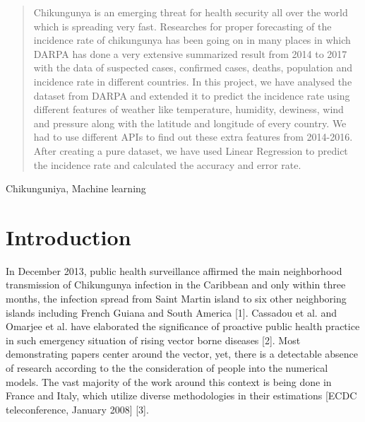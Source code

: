 \documentclass[conference]{IEEEtran}
\begin{document}




\maketitle

\thispagestyle{fancy}

\begin{abstract}
Chikungunya   is an emerging threat for health security all over the world  which is spreading very fast. Researches for proper forecasting of the incidence rate of chikungunya has been going on in many places in which DARPA has done a very extensive summarized result from 2014 to 2017 with the data of suspected cases, confirmed cases, deaths, population and incidence rate in different countries. In this project, we have analysed the dataset from DARPA and extended it to predict the incidence rate using different features of weather like temperature, humidity, dewiness, wind and pressure  along with the latitude and longitude of every country. We had to use different APIs to find out these extra features from 2014-2016. After creating a pure dataset, we have used Linear Regression to predict the incidence rate and calculated the accuracy and error rate.
\end{abstract}


\begin{keywords}
Chikunguniya, Machine learning
\end{keywords}


%
\IEEEpeerreviewmaketitle



\section{Introduction}
In December 2013, public health surveillance affirmed the main neighborhood transmission of Chikungunya infection in the Caribbean and only within three months, the infection spread from  Saint Martin island to six other neighboring islands including French Guiana and South America [1]. Cassadou et al. and Omarjee et al. have elaborated the significance of proactive public health practice in such emergency situation of rising vector borne diseases [2]. Most demonstrating papers center around the vector, yet, there is a detectable absence of research according to the the consideration of people into the numerical models. The vast majority of the work around this context is being done in France and Italy, which utilize diverse methodologies in their estimations [ECDC teleconference, January 2008] [3].
\end{document}
